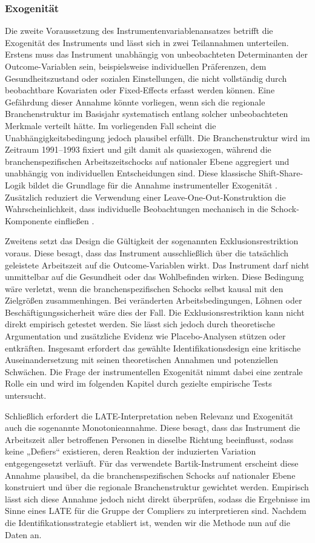 \documentclass[12pt,a4paper]{article}
\begin{document}
\subsubsection{Exogenität}
Die zweite Voraussetzung des Instrumentenvariablenansatzes betrifft die Exogenität des Instruments und lässt sich in zwei Teilannahmen unterteilen. Erstens muss das Instrument unabhängig von unbeobachteten Determinanten der Outcome-Variablen sein, beispielsweise individuellen Präferenzen, dem Gesundheitszustand oder sozialen Einstellungen, die nicht vollständig durch beobachtbare Kovariaten oder Fixed-Effects erfasst werden können. Eine Gefährdung dieser Annahme könnte vorliegen, wenn sich die regionale Branchenstruktur im Basisjahr systematisch entlang solcher unbeobachteten Merkmale verteilt hätte. Im vorliegenden Fall scheint die Unabhängigkeitsbedingung jedoch plausibel erfüllt. Die Branchenstruktur wird im Zeitraum 1991–1993 fixiert und gilt damit als quasiexogen, während die branchenspezifischen Arbeitszeitschocks auf nationaler Ebene aggregiert und unabhängig von individuellen Entscheidungen sind. Diese klassische Shift-Share-Logik bildet die Grundlage für die Annahme instrumenteller Exogenität \parencite{borusyak2025}. Zusätzlich reduziert die Verwendung einer Leave-One-Out-Konstruktion die Wahrscheinlichkeit, dass individuelle Beobachtungen mechanisch in die Schock-Komponente einfließen \parencite{goldsmith2020}.

Zweitens setzt das Design die Gültigkeit der sogenannten Exklusionsrestriktion voraus. Diese besagt, dass das Instrument ausschließlich über die tatsächlich geleistete Arbeitszeit auf die Outcome-Variablen wirkt. Das Instrument darf nicht unmittelbar auf die Gesundheit oder das Wohlbefinden wirken. Diese Bedingung wäre verletzt, wenn die branchenspezifischen Schocks selbst kausal mit den Zielgrößen zusammenhingen. Bei veränderten Arbeitsbedingungen, Löhnen oder Beschäftigungssicherheit wäre dies der Fall. Die Exklusionsrestriktion kann nicht direkt empirisch getestet werden. Sie lässt sich jedoch durch theoretische Argumentation und zusätzliche Evidenz wie Placebo-Analysen stützen oder entkräften. Insgesamt erfordert das gewählte Identifikationsdesign eine kritische Auseinandersetzung mit seinen theoretischen Annahmen und potenziellen Schwächen. Die Frage der instrumentellen Exogenität nimmt dabei eine zentrale Rolle ein und wird im folgenden Kapitel durch gezielte empirische Tests untersucht. 

Schließlich erfordert die LATE-Interpretation neben Relevanz und Exogenität auch die sogenannte Monotonieannahme. Diese besagt, dass das Instrument die Arbeitszeit aller betroffenen Personen in dieselbe Richtung beeinflusst, sodass keine „Defiers“ existieren, deren Reaktion der induzierten Variation entgegengesetzt verläuft. Für das verwendete Bartik-Instrument erscheint diese Annahme plausibel, da die branchenspezifischen Schocks auf nationaler Ebene konstruiert und über die regionale Branchenstruktur gewichtet werden. Empirisch lässt sich diese Annahme jedoch nicht direkt überprüfen, sodass die Ergebnisse im Sinne eines LATE für die Gruppe der Compliers zu interpretieren sind. Nachdem die Identifikationsstrategie etabliert ist, wenden wir die Methode nun auf die Daten an.
\end{document}
